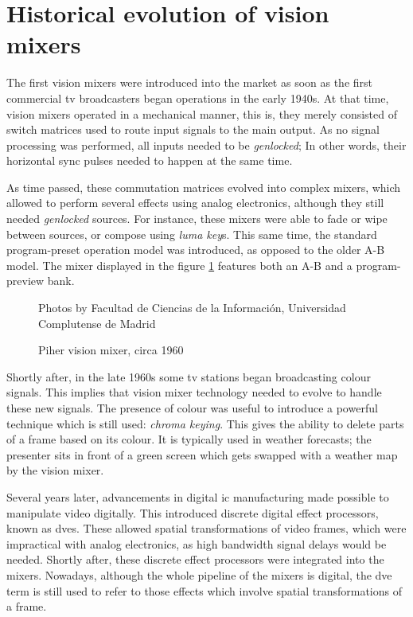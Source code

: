 \documentclass[../main.tex]{subfiles}
\begin{document}
\section{Historical evolution of vision mixers}
The first vision mixers were introduced into the market as soon as the first commercial \gls{tv} broadcasters began operations in the early 1940s\cite{ArmesRoy1988Ov}. At that time, vision mixers operated in a mechanical manner, this is, they merely consisted of switch matrices used to route input signals to the main output. As no signal processing was performed, all inputs needed to be \textit{genlocked}; In other words, their horizontal sync pulses needed to happen at the same time\cite{becg2020}.\newline

As time passed, these commutation matrices evolved into complex mixers, which allowed to perform several effects using analog electronics, although they still needed \textit{genlocked} sources. For instance, these mixers were able to fade or wipe between sources, or compose using \textit{luma key}s\cite{WardPeter2001Saob}. This same time, the standard program-preset operation model was introduced, as opposed to the older A-B model. The mixer displayed in the figure \ref{fig:piher} features both an A-B and a program-preview bank.\newline

\begin{figure}[hbtp]
    \centering
    \footnotesize{Photos by Facultad de Ciencias de la Información, Universidad Complutense de Madrid}

    \caption{Piher vision mixer, circa 1960}
    \label{fig:piher}
\end{figure}

Shortly after, in the late 1960s some \gls{tv} stations began broadcasting colour signals. This implies that vision mixer technology needed to evolve to handle these new signals. The presence of colour was useful to introduce a powerful technique which is still used: \textit{chroma keying}\cite{jpeters}\cite{tmMixerHistory}. This gives the ability to delete parts of a frame based on its colour. It is typically used in weather forecasts; the presenter sits in front of a green screen which gets swapped with a weather map by the vision mixer.\newline

Several years later, advancements in digital \gls{ic} manufacturing made possible to manipulate video digitally\cite{kitplus2015}. This introduced discrete digital effect processors, known as \glspl{dve}. These allowed spatial transformations of video frames, which were impractical with analog electronics, as high bandwidth signal delays would be needed. Shortly after, these discrete effect processors were integrated into the mixers. Nowadays, although the whole pipeline of the mixers is digital, the \gls{dve} term is still used to refer to those effects which involve spatial transformations of a frame\cite{OwensJim2020Tp}\cite{UtterbackAndrew2015STPa}.\newline
\end{document}
